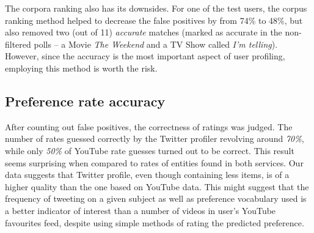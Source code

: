 The corpora ranking also has its downsides. For one of the test users, the corpus ranking method helped to
decrease the false positives by from 74\% to 48\%, but also removed two (out of 11) \textit{accurate} matches (marked as
accurate in the non-filtered polls -- a Movie \textit{The Weekend} and a TV Show called \textit{I'm telling}).
However, since the accuracy is the most important aspect of user profiling, employing this method is worth
the risk.

\subsection{Preference rate accuracy}
After counting out false positives, the correctness of ratings was judged. The
number of rates guessed correctly by the Twitter profiler revolving around \textit{70\%},
while only \textit{50\%} of YouTube rate guesses turned out to be correct. This
result seems surprising when compared to rates of entities found in both
services. Our data suggests that Twitter profile, even though containing less
items, is of a higher quality than the one based on YouTube data.  This
might suggest that the frequency of tweeting on a given subject as well as
preference vocabulary used is a better indicator of interest than a number of
videos in user's YouTube favourites feed, despite using simple methods of rating
the predicted preference.
